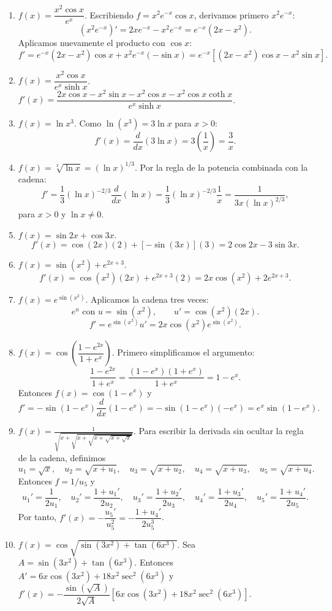 \documentclass[12pt, letterpaper]{article}
\makeatletter
\renewcommand{\alph}[1]{\expandafter\@alphlatin\csname c@#1\endcsname}
\newcommand{\@alphlatin}[1]{\ifcase#1\or a\or b\or c\or d\or e\or f\or g\or h\or i\or j\or k\or l\or m\or n\or o\or p\or q\or r\or s\or t\or u\or v\or w\or x\or y\or z\else\@ctrerr\fi}
\makeatother
\begin{document}
\begin{enumerate}[label=\alph*)]
\[  \]
  para $x\neq0,\pm1$.
  \item $f(x)=\dfrac{x^2\cos x}{e^x}$. Escribiendo $f=x^2e^{-x}\cos x$, derivamos primero $x^2e^{-x}$:
  \[
  (x^2e^{-x})'=2xe^{-x}-x^2e^{-x}=e^{-x}(2x-x^2).
  \]
  Aplicamos nuevamente el producto con $\cos x$:
  \[
  f'=e^{-x}(2x-x^2)\cos x+x^2e^{-x}(-\sin x)
  =\boxed{e^{-x}\left[(2x-x^2)\cos x-x^2\sin x\right]}.
  \]
  \item $f(x)=\dfrac{x^2\cos x}{e^x\sinh x}$.\\
  $\boxed{f'(x)=\dfrac{2x\cos x-x^2\sin x-x^2\cos x-x^2\cos x\coth x}{e^x\sinh x}}$.
  \item $f(x)=\ln x^3$. Como $\ln(x^3)=3\ln x$ para $x>0$:
  \[
  f'(x)=\frac{d}{dx}(3\ln x)=3\left(\frac1x\right)
  =\boxed{\frac3x}.
  \]
  \item $f(x)=\sqrt[3]{\ln x}=(\ln x)^{1/3}$. Por la regla de la potencia combinada con la cadena:
  \[
  f'=\frac13(\ln x)^{-2/3}\frac{d}{dx}(\ln x)
  =\frac13(\ln x)^{-2/3}\frac1x
  =\boxed{\dfrac{1}{3x(\ln x)^{2/3}}},
  \]
  para $x>0$ y $\ln x\neq0$.
  \item $f(x)=\sin 2x+\cos 3x$.\\
  \[
  f'(x)=\cos(2x)(2)+[-\sin(3x)](3)
  =\boxed{2\cos2x-3\sin3x}.
  \]
  \item $f(x)=\sin(x^2)+e^{2x+3}$.\\
  \[
  f'(x)=\cos(x^2)(2x)+e^{2x+3}(2)
  =\boxed{2x\cos(x^2)+2e^{2x+3}}.
  \]
  \item $f(x)=e^{\sin(x^2)}$. Aplicamos la cadena tres veces:
  \[
  e^u\text{ con }u=\sin(x^2),\qquad
  u'=\cos(x^2)(2x).
  \]
  \[
  f'=e^{\sin(x^2)}u'
  =\boxed{2x\cos(x^2)e^{\sin(x^2)}}.
  \]
  \item $f(x)=\cos\left(\dfrac{1-e^{2x}}{1+e^x}\right)$. Primero simplificamos el argumento:
  \[
  \frac{1-e^{2x}}{1+e^x}
  =\frac{(1-e^x)(1+e^x)}{1+e^x}
  =1-e^x.
  \]
  Entonces $f(x)=\cos(1-e^x)$ y
  \[
  f'= -\sin(1-e^x)\frac{d}{dx}(1-e^x)
  =-\sin(1-e^x)(-e^x)
  =\boxed{e^x\sin(1-e^x)}.
  \]
  \item $\displaystyle f(x)=\frac{1}{\sqrt{x+\sqrt{x+\sqrt{x+\sqrt{x+\sqrt{x}}}}}}$. Para escribir la derivada sin ocultar la regla de la cadena, definimos
  \[
  u_1=\sqrt{x},\quad u_2=\sqrt{x+u_1},\quad u_3=\sqrt{x+u_2},\quad
  u_4=\sqrt{x+u_3},\quad u_5=\sqrt{x+u_4}.
  \]
  Entonces $f=1/u_5$ y
  \[
  u_1'=\frac1{2u_1},\quad u_2'=\frac{1+u_1'}{2u_2},\quad
  u_3'=\frac{1+u_2'}{2u_3},\quad u_4'=\frac{1+u_3'}{2u_4},\quad
  u_5'=\frac{1+u_4'}{2u_5}.
  \]
  Por tanto, $\boxed{f'(x)=-\dfrac{u_5'}{u_5^2}=-\dfrac{1+u_4'}{2u_5^3}}$.
  \item $f(x)=\cos\sqrt{\sin(3x^2)+\tan(6x^3)}$. Sea $A=\sin(3x^2)+\tan(6x^3)$. Entonces $A'=6x\cos(3x^2)+18x^2\sec^2(6x^3)$ y
  $\boxed{f'(x)=-\dfrac{\sin(\sqrt A)}{2\sqrt A}\left[6x\cos(3x^2)+18x^2\sec^2(6x^3)\right]}$.
\end{enumerate}
\end{document}
